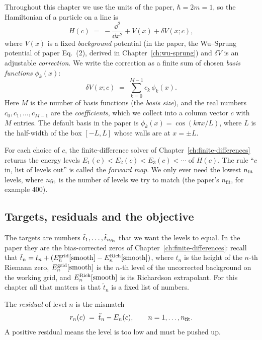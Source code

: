 Throughout this chapter we use the units of the paper, $\hbar=2m=1$, so the Hamiltonian of a particle on a line is
\begin{equation}
H(c) \;=\; -\frac{\dd^2}{\dd x^2} + V(x) + \delta V(x;c),
\label{eq:fitting-H}
\end{equation}
where $V(x)$ is a fixed \emph{background} potential (in the paper, the Wu--Sprung potential of paper Eq.~(2), derived in Chapter~\ref{ch:wu-sprung}) and $\delta V$ is an adjustable \emph{correction}. We write the correction as a finite sum of chosen \emph{basis functions} $\phi_k(x)$:
\begin{equation}
\delta V(x;c) \;=\; \sum_{k=0}^{M-1} c_k\,\phi_k(x).
\label{eq:fitting-deltaV}
\end{equation}
Here $M$ is the number of basis functions (the \emph{basis size}), and the real numbers $c_0,c_1,\dots,c_{M-1}$ are the \emph{coefficients}, which we collect into a column vector $c$ with $M$ entries. The default basis in the paper is $\phi_k(x)=\cos(k\pi x/L)$, where $L$ is the half-width of the box $[-L,L]$ whose walls are at $x=\pm L$.

For each choice of $c$, the finite-difference solver of Chapter~\ref{ch:finite-differences} returns the energy levels $E_1(c)<E_2(c)<E_3(c)<\cdots$ of $H(c)$. The rule ``$c$ in, list of levels out'' is called the \emph{forward map}. We only ever need the lowest $n_{\rm fit}$ levels, where $n_{\rm fit}$ is the number of levels we try to match (the paper's $n_{\mathrm{fit}}$, for example 400).

\subsection{Targets, residuals and the objective}

The targets are numbers $\tilde t_1,\dots,\tilde t_{n_{\rm fit}}$ that we want the levels to equal. In the paper they are the bias-corrected zeros of Chapter~\ref{ch:finite-differences}: recall that $\tilde t_n=t_n+(E^{\rm grid}_n[\mathrm{smooth}]-E^{\rm Rich}_n[\mathrm{smooth}])$, where $t_n$ is the height of the $n$-th Riemann zero, $E^{\rm grid}_n[\mathrm{smooth}]$ is the $n$-th level of the uncorrected background on the working grid, and $E^{\rm Rich}_n[\mathrm{smooth}]$ is its Richardson extrapolant. For this chapter all that matters is that $\tilde t_n$ is a fixed list of numbers.

The \emph{residual} of level $n$ is the mismatch
\begin{equation}
r_n(c) \;=\; \tilde t_n - E_n(c), \qquad n=1,\dots,n_{\rm fit}.
\label{eq:fitting-residual}
\end{equation}
A positive residual means the level is too low and must be pushed up.

